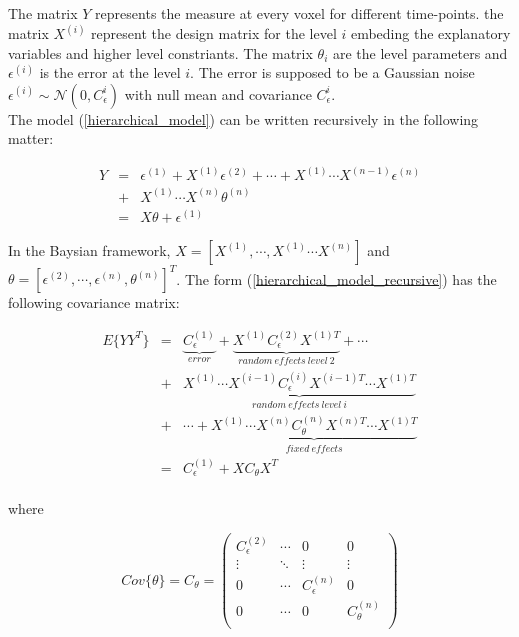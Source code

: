 \documentclass[final, paper=letter,5p,times,twocolumn]{elsarticle}
\theoremstyle{definition}
\begin{document}
The matrix $Y$ represents the measure at every voxel for different time-points. the matrix $X^{(i)}$ represent the design matrix for the level $i$ embeding the explanatory variables and higher level constriants. The matrix $\theta_{i}$ are the level parameters and $\epsilon^{(i)}$ is the error at the level $i$. The error is supposed to be a Gaussian noise $\epsilon^{(i)} \sim \mathcal{N}(0,C_{\epsilon}^{i})$ with null mean and covariance $C_{\epsilon}^{i}$.\\
The model (\ref{hierarchical_model}) can be written recursively in the following matter:

\begin{equation}
  \left .
  \begin{array}{rcl}
    Y & = & \epsilon^{(1)} +  X^{(1)} \epsilon^{(2)} + \cdots + X^{(1)} \cdots X^{(n-1)} \epsilon^{(n)}   \\
    & + & X^{(1)} \cdots X^{(n)} \theta^{(n)}\\
    & = & X\theta + \epsilon^{(1)} 
  \end{array}
  \right .
  \label{hierarchical_model_recursive}
\end{equation}

In the Baysian framework, $X = [X^{(1)}, \cdots, X^{(1)} \cdots X^{(n)}]$ and $\theta = [\epsilon^{(2)}, \cdots, \epsilon^{(n)}, \theta^{(n)}]^{T}$. The form (\ref{hierarchical_model_recursive}) has the following covariance matrix:

\begin{equation}
  \left .
  \begin{array}{rcl}
    E\{YY^{T}\} & = & \underset{error}{\underbrace{C_{\epsilon}^{(1)}}} +  \underset{random~effects~level~2}{\underbrace{X^{(1)} C_{\epsilon}^{(2)} X^{(1)T}}} + \cdots \\
    & + & \underset{random~effects~level~i}{\underbrace{X^{(1)} \cdots X^{(i-1)} C_{\epsilon}^{(i)} X^{(i-1)T} \cdots X^{(1)T}}}  \\
    & + & \cdots + \underset{fixed~effects}{\underbrace{X^{(1)} \cdots X^{(n)} C_{\theta}^{(n)}X^{(n)T} \cdots X^{(1)T}}} \\
    & = & C_{\epsilon}^{(1)} + XC_{\theta}X^{T} \\
  \end{array}
  \right .
  \label{hierarchical_cov_recursive}
\end{equation}

where

\begin{equation}
  Cov\{\theta\} = C_{\theta} = \left (
  \begin{array}{cccc}
   C_{\epsilon}^{(2)} & \cdots & 0 & 0\\
   \vdots & \ddots & \vdots & \vdots \\
   0 & \cdots & C_{\epsilon}^{(n)} & 0 \\
   0 & \cdots & 0 & C_{\theta}^{(n)}\\
  \end{array}
  \right )
  \label{C_theta}
\end{equation}
\end{document}
